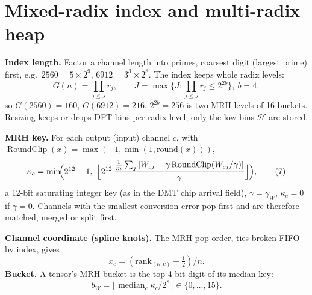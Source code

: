 \documentclass[11pt]{article}
\newcommand{\RoundClip}{\operatorname{RoundClip}}
\begin{document}
\section{Mixed-radix index and multi-radix heap}
\textbf{Index length.} Factor a channel length into primes, coarsest digit (largest prime) first, e.g.\ $2560=5\times2^9$, $6912=3^3\times2^8$. The index keeps whole radix levels:
\begin{equation}G(n)=\prod_{j\le J} r_j,\qquad J=\max\{J:\textstyle\prod_{j\le J}r_j\le 2^{2b}\},\ b=4 ,\tag{6}\end{equation}
so $G(2560)=160$, $G(6912)=216$. $2^{2b}=256$ is two MRH levels of 16 buckets. Resizing keeps or drops DFT bins per radix level; only the low bins $\mathcal H$ are stored.

\textbf{MRH key.} For each output (input) channel $c$, with $\RoundClip(x)=\max(-1,\min(1,\mathrm{round}(x)))$,
\begin{equation}\kappa_c=\min\!\Bigl(2^{12}-1,\ \Bigl\lfloor 2^{12}\,\frac{\frac1m\sum_j|W_{cj}-\gamma\RoundClip(W_{cj}/\gamma)|}{\gamma}\Bigr\rfloor\Bigr),\tag{7}\end{equation}
a 12-bit saturating integer key (as in the DMT chip arrival field), $\gamma=\gamma_W$, $\kappa_c=0$ if $\gamma=0$. Channels with the smallest conversion error pop first and are therefore matched, merged or split first.

\textbf{Channel coordinate (spline knots).} The MRH pop order, ties broken FIFO by index, gives
\begin{equation}x_c=(\mathrm{rank}_{(\kappa,c)}+\tfrac12)/n .\tag{8}\end{equation}
\textbf{Bucket.} A tensor's MRH bucket is the top 4-bit digit of its median key:
\begin{equation}b_W=\lfloor\operatorname{median}_c\kappa_c/2^{8}\rfloor\in\{0,\dots,15\}.\tag{9}\end{equation}
\end{document}
